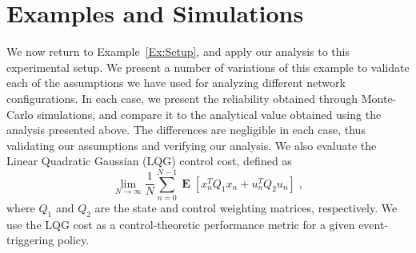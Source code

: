 \documentclass[journal]{IEEEtran}
\DeclareMathOperator*{\E}{{\mathbf E}}        \let\Pr\undefined \DeclareMathOperator{\Pr}{{\mathbf P}}        \DeclareMathOperator*{\argmax}{arg\,max}
\begin{document}
\section{Examples and Simulations} \label{S:Sims}

We now return to Example~\ref{Ex:Setup}, and apply our analysis to this experimental setup. We present a number of variations of this example to validate each of the assumptions we have used for analyzing different network configurations. In each case, we present the reliability obtained through Monte-Carlo simulations, and compare it to the analytical value obtained using the analysis presented above. The differences are negligible in each case, thus validating our assumptions and verifying our analysis. We also evaluate the Linear Quadratic Gaussian (LQG) control cost, defined as
\begin{equation*}
\lim_{N \to \infty} \frac{1}{N} \sum_{n=0}^{N-1} \E \left[ x_n^T Q_1 x_n + u_n^T Q_2 u_n \right] \; ,
\end{equation*}
where $Q_1$ and $Q_2$ are the state and control weighting matrices, respectively. We use the LQG cost as a control-theoretic performance metric for a given event-triggering policy.
\end{document}

